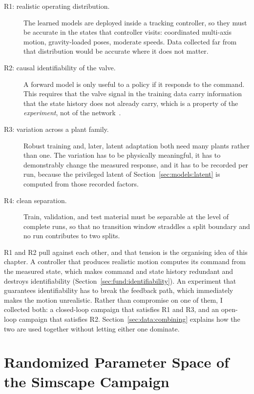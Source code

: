 \begin{description}
  \item[R1: realistic operating distribution.] The learned models are
    deployed inside a tracking controller, so they must be accurate in
    the states that controller visits: coordinated multi-axis
    motion, gravity-loaded poses, moderate speeds. Data collected far
    from that distribution would be accurate where it does not matter.
  \item[R2: causal identifiability of the valve.] A forward model is
    only useful to a policy if it responds to the command. This requires
    that the valve signal in the training data carry information that the
    state history does not already carry, which is a property of the
    \emph{experiment}, not of the network~\cite{ljung1999system,
    isermann2011identification}.
  \item[R3: variation across a plant family.] Robust training and, later,
    latent adaptation both need many plants rather than one. The
    variation has to be physically meaningful, it has to demonstrably
    change the measured response, and it has to be recorded per run,
    because the privileged latent of Section~\ref{sec:models:latent} is computed from those recorded factors.
  \item[R4: clean separation.] Train, validation, and test material must
    be separable at the level of complete runs, so that no transition
    window straddles a split boundary and no run contributes to two
    splits.
\end{description}

R1 and R2 pull against each other, and that tension is the organising
idea of this chapter. A controller that produces realistic motion
computes its command from the measured state, which makes command and
state history redundant and destroys identifiability
(Section~\ref{sec:fund:identifiability}). An experiment that guarantees
identifiability has to break the feedback path, which immediately makes
the motion unrealistic. Rather than compromise on one of them, I
collected both: a closed-loop campaign that satisfies R1 and R3, and an
open-loop campaign that satisfies R2. Section~\ref{sec:data:combining}
explains how the two are used together without letting either one
dominate.

\section{Randomized Parameter Space of the Simscape Campaign}
\label{sec:data:randomization}


